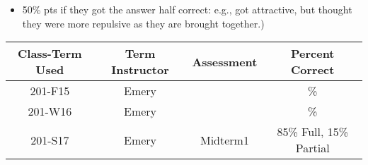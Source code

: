 \begin{rubric}

\begin{itemize}
	\item 50\% pts if they got the answer half correct: e.g., got attractive, but thought they were more repulsive as they are brought together.) 
\end{itemize}

\end{rubric}

\begin{outcomes}
	\begin{center}
		\begin{tabular}{cccc}
			\hline\hline
			Class-Term Used & Term Instructor & Assessment & Percent Correct\\
			\hline
			201-F15 & Emery &  & \%\\    %
			201-W16 & Emery &  & \%\\    %
			201-S17 & Emery & Midterm1 & 85\% Full, 15\% Partial\\    %
			\hline
		\end{tabular}
	\end{center}
\end{outcomes}

\begin{comments}
	
\end{comments}

